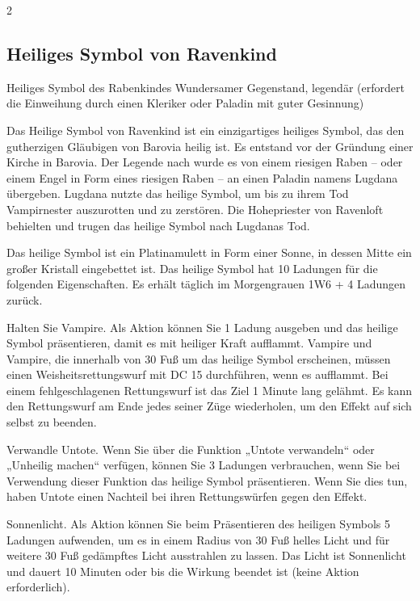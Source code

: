 \begin{multicols}{2}


    \subsection*{Heiliges Symbol von Ravenkind}

    Heiliges Symbol des Rabenkindes
Wundersamer Gegenstand, legendär (erfordert die Einweihung durch einen Kleriker oder Paladin mit guter Gesinnung)

Das Heilige Symbol von Ravenkind ist ein einzigartiges heiliges Symbol, das den gutherzigen Gläubigen von Barovia heilig ist. Es entstand vor der Gründung einer Kirche in Barovia. Der Legende nach wurde es von einem riesigen Raben – oder einem Engel in Form eines riesigen Raben – an einen Paladin namens Lugdana übergeben. Lugdana nutzte das heilige Symbol, um bis zu ihrem Tod Vampirnester auszurotten und zu zerstören. Die Hohepriester von Ravenloft behielten und trugen das heilige Symbol nach Lugdanas Tod.

Das heilige Symbol ist ein Platinamulett in Form einer Sonne, in dessen Mitte ein großer Kristall eingebettet ist. Das heilige Symbol hat 10 Ladungen für die folgenden Eigenschaften. Es erhält täglich im Morgengrauen 1W6 + 4 Ladungen zurück.

Halten Sie Vampire. Als Aktion können Sie 1 Ladung ausgeben und das heilige Symbol präsentieren, damit es mit heiliger Kraft aufflammt. Vampire und Vampire, die innerhalb von 30 Fuß um das heilige Symbol erscheinen, müssen einen Weisheitsrettungswurf mit DC 15 durchführen, wenn es aufflammt. Bei einem fehlgeschlagenen Rettungswurf ist das Ziel 1 Minute lang gelähmt. Es kann den Rettungswurf am Ende jedes seiner Züge wiederholen, um den Effekt auf sich selbst zu beenden.

Verwandle Untote. Wenn Sie über die Funktion „Untote verwandeln“ oder „Unheilig machen“ verfügen, können Sie 3 Ladungen verbrauchen, wenn Sie bei Verwendung dieser Funktion das heilige Symbol präsentieren. Wenn Sie dies tun, haben Untote einen Nachteil bei ihren Rettungswürfen gegen den Effekt.

Sonnenlicht. Als Aktion können Sie beim Präsentieren des heiligen Symbols 5 Ladungen aufwenden, um es in einem Radius von 30 Fuß helles Licht und für weitere 30 Fuß gedämpftes Licht ausstrahlen zu lassen. Das Licht ist Sonnenlicht und dauert 10 Minuten oder bis die Wirkung beendet ist (keine Aktion erforderlich).


\end{multicols}
